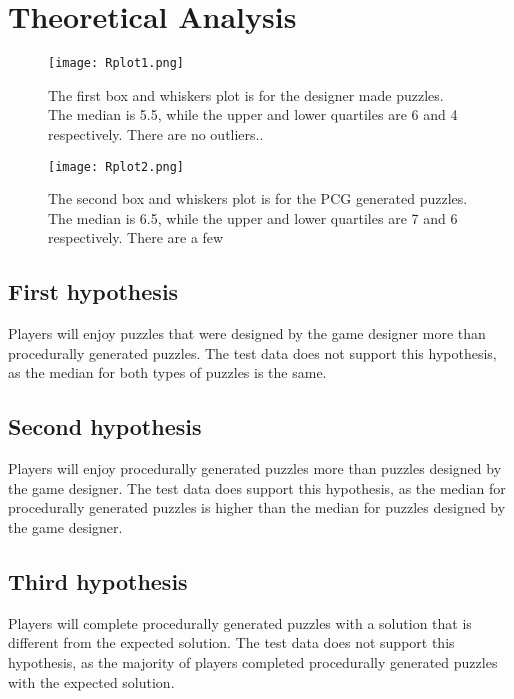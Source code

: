 \documentclass[lettersize,journal]{IEEEtran}
\begin{document}
\section{Theoretical Analysis}

\begin{figure}
\begin{center}
  \texttt{[image: Rplot1.png]}
\caption{ The first box and whiskers plot is for the designer made puzzles. The median is 5.5, while the upper and lower quartiles are 6 and 4 respectively. There are no outliers..}
  \label{fig:rplot1}
	
\end{center}
\end{figure}

\begin{figure}
\begin{center}
  \texttt{[image: Rplot2.png]}
\caption{The second box and whiskers plot is for the PCG generated puzzles. The median is 6.5, while the upper and lower quartiles are 7 and 6 respectively. There are a few}
  \label{fig:rplot2}
	
\end{center}
\end{figure}

\subsection {First hypothesis} Players will enjoy puzzles that were designed by the game designer more than procedurally generated puzzles. The test data does not support this hypothesis, as the median for both types of puzzles is the same.

\subsection {Second hypothesis} Players will enjoy procedurally generated puzzles more than puzzles designed by the game designer. The test data does support this hypothesis, as the median for procedurally generated puzzles is higher than the median for puzzles designed by the game designer.

\subsection {Third hypothesis}Players will complete procedurally generated puzzles with a solution that is different from the expected solution. The test data does not support this hypothesis, as the majority of players completed procedurally generated puzzles with the expected solution.
\end{document}
